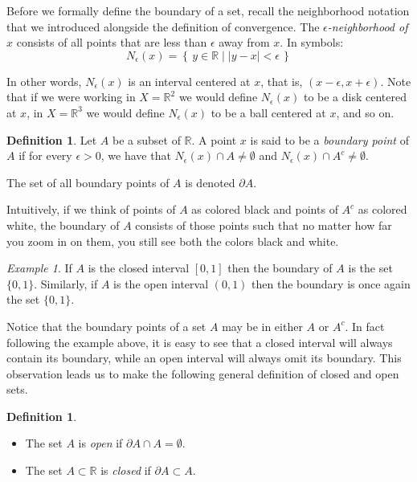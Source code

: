 \documentclass[11pt,oneside]{amsbook}
\newcommand{\set}[1]{\left\{\,#1\,\right\}}
\newcommand{\R}{\mathbb R}
\theoremstyle{definition}
\theoremstyle{plain}
\theoremstyle{definition}
\newtheorem{definition}[theorem]{Definition}
\theoremstyle{remark}
\newtheorem{example}[theorem]{Example}
\numberwithin{equation}{section}
\numberwithin{figure}{section}
\begin{document}
Before we formally define the boundary of a set, recall the neighborhood notation that we introduced alongside the definition of convergence. The \emph{$\epsilon$-neighborhood of $x$} consists of all points that are less than $\epsilon$ away from $x$. In symbols:
\[N_\epsilon(x)=\set{y\in\R\mid|y-x|<\epsilon}
\]

In other words, $N_\epsilon(x)$ is an interval centered at $x$, that is, $(x-\epsilon,x+\epsilon)$. Note that if we were working in $X=\R^2$ we would define $N_\epsilon(x)$ to be a disk centered at $x$, in $X=\R^3$ we would define $N_\epsilon(x)$ to be a ball centered at $x$, and so on.

\begin{definition}
  Let $A$ be a subset of $\R$. A point $x$ is said to be a \emph{boundary point} of $A$ if for every $\epsilon>0$, we have that $N_\epsilon(x)\cap A\neq\emptyset$ and $N_\epsilon(x)\cap A^c\neq\emptyset$.
  
  The set of all boundary points of $A$ is denoted $\partial A$.
\end{definition}

Intuitively, if we think of points of $A$ as colored black and points of $A^c$ as colored white, the boundary of $A$ consists of those points such that no matter how far you zoom in on them, you still see both the colors black and white.

\begin{example}
  If $A$ is the closed interval $[0,1]$ then the boundary of $A$ is the set $\{0,1\}$. Similarly, if $A$ is the open interval $(0,1)$ then the boundary is once again the set $\{0,1\}$.
\end{example}

Notice that the boundary points of a set $A$ may be in either $A$ or $A^c$. In fact following the example above, it is easy to see that a closed interval will always contain its boundary, while an open interval will always omit its boundary. This observation leads us to make the following general definition of closed and open sets.

\begin{definition}
  \begin{itemize}
    \item The set $A$ is \emph{open} if $\partial A\cap A=\emptyset$.
    \item The set $A\subset\R$ is \emph{closed} if $\partial A\subset A$.
  \end{itemize}
\end{definition}
\end{document}
